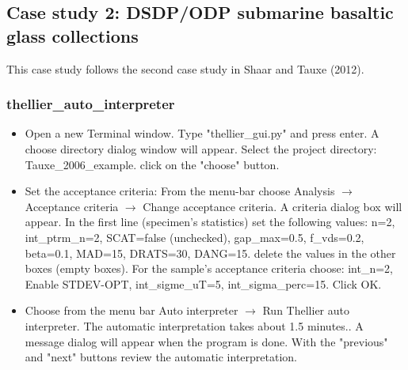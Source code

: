 \documentclass[12pt]{article}
\begin{document}
\subsection{Case study 2: DSDP/ODP submarine basaltic glass collections}
This case study follows the second case study  in Shaar and Tauxe (2012). 
\subsubsection{thellier\_auto\_interpreter}
\begin{itemize}
\item Open a new Terminal window. Type "thellier\_gui.py" and press enter. A choose directory dialog window will appear. Select the project directory: Tauxe\_2006\_example. click on the "choose" button.
\item  Set the acceptance criteria: From the menu-bar choose  Analysis $\rightarrow$ Acceptance criteria $\rightarrow$ Change acceptance criteria. A criteria dialog box will appear. In the first line (specimen's statistics) set the following values: n=2, int\_ptrm\_n=2, SCAT=false (unchecked), gap\_max=0.5, f\_vds=0.2, beta=0.1, MAD=15, DRATS=30, DANG=15. delete the values in the other boxes (empty boxes). For the sample's acceptance criteria choose: int\_n=2,  Enable STDEV-OPT, int\_sigme\_uT=5, int\_sigma\_perc=15. Click OK.
\item Choose from the menu bar Auto interpreter $\rightarrow$ Run Thellier auto interpreter. The automatic interpretation takes about 1.5 minutes.. A message dialog will appear when the program is done. With the "previous" and "next" buttons review the automatic interpretation. 
\end{itemize}
\end{document}
